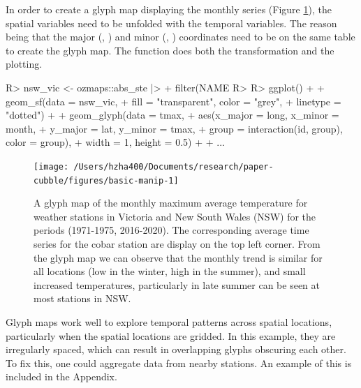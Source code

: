 \documentclass[
  shortnames]{jss}
\begin{document}
In order to create a glyph map displaying the monthly series (Figure \ref{fig:basic-manip}), the spatial variables need to be unfolded with the temporal variables. The reason being that the major (, ) and minor (, ) coordinates need to be on the same table to create the glyph map. The  function does both the transformation and the plotting.

\begin{CodeChunk}
\begin{CodeInput}
R> nsw_vic <- ozmaps::abs_ste |>
+   filter(NAME %
R> 
R> ggplot() +
+   geom_sf(data = nsw_vic,
+           fill = "transparent", color = "grey",
+           linetype = "dotted") +
+   geom_glyph(data = tmax,
+              aes(x_major = long, x_minor = month,
+                  y_major = lat, y_minor = tmax,
+                  group = interaction(id, group), color = group),
+              width = 1, height = 0.5) +
+   ...
\end{CodeInput}
\end{CodeChunk}

\begin{CodeChunk}
\begin{figure}

{\centering \texttt{[image: /Users/hzha400/Documents/research/paper-cubble/figures/basic-manip-1]} 

}

\caption[A glyph map of the monthly maximum average temperature for weather stations in  Victoria and New South Wales (NSW) for the periods (1971-1975, 2016-2020)]{A glyph map of the monthly maximum average temperature for weather stations in  Victoria and New South Wales (NSW) for the periods (1971-1975, 2016-2020). The corresponding average time series for the cobar station are display on the top left corner. From the glyph map we can observe that the monthly trend is similar for all locations (low in the winter, high in the summer), and small increased temperatures, particularly in late summer can be seen at most stations in NSW.}\label{fig:basic-manip}
\end{figure}
\end{CodeChunk}

Glyph maps work well to explore temporal patterns across spatial locations, particularly when the spatial locations are gridded. In this example, they are irregularly spaced, which can result in overlapping glyphs obscuring each other. To fix this, one could aggregate data from nearby stations. An example of this is included in the Appendix.
\end{document}
